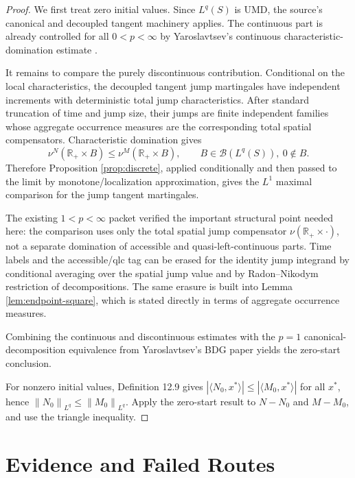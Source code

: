 \documentclass[11pt]{article}
\newcommand{\R}{\mathbb R}
\newcommand{\cB}{\mathcal B}
\newcommand{\norm}[1]{\left\lVert #1\right\rVert}
\newcommand{\Lq}{L^q(S)}
\begin{document}
\begin{proof}
We first treat zero initial values.  Since \(L^q(S)\) is UMD, the source's
canonical and decoupled tangent machinery applies.  The continuous part is
already controlled for all \(0<p<\infty\) by Yaroslavtsev's continuous
characteristic-domination estimate \cite[Proposition 12.6]{Yaroslavtsev2019}.

It remains to compare the purely discontinuous contribution.  Conditional on
the local characteristics, the decoupled tangent jump martingales have
independent increments with deterministic total jump characteristics.  After
standard truncation of time and jump size, their jumps are finite independent
families whose aggregate occurrence measures are the corresponding total
spatial compensators.  Characteristic domination gives
\[
  \nu^N(\R_+\times B)\le \nu^M(\R_+\times B),
  \qquad B\in\cB(\Lq),\ 0\notin B.
\]
Therefore Proposition \ref{prop:discrete}, applied conditionally and then
passed to the limit by monotone/localization approximation, gives the \(L^1\)
maximal comparison for the jump tangent martingales.

The existing \(1<p<\infty\) packet verified the important structural point
needed here: the comparison uses only the total spatial jump compensator
\(\nu(\R_+\times\cdot)\), not a separate domination of accessible and
quasi-left-continuous parts.  Time labels and the accessible/qlc tag can be
erased for the identity jump integrand by conditional averaging over the
spatial jump value and by Radon--Nikodym restriction of decompositions.  The
same erasure is built into Lemma \ref{lem:endpoint-square}, which is stated
directly in terms of aggregate occurrence measures.

Combining the continuous and discontinuous estimates with the \(p=1\)
canonical-decomposition equivalence from Yaroslavtsev's BDG paper
\cite[Section 4.3]{Yaroslavtsev2018} yields the zero-start conclusion.

For nonzero initial values, Definition 12.9 gives
\(|\langle N_0,x^*\rangle|\le |\langle M_0,x^*\rangle|\) for all \(x^*\), hence
\(\norm{N_0}_{L^q}\le\norm{M_0}_{L^q}\).  Apply the zero-start result to
\(N-N_0\) and \(M-M_0\), and use the triangle inequality.
\end{proof}

\section*{Evidence and Failed Routes}
\end{document}

